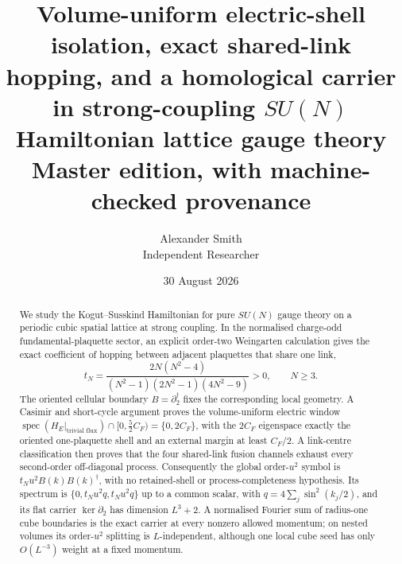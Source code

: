 \documentclass[11pt]{article}
\theoremstyle{plain}
\theoremstyle{definition}
\theoremstyle{remark}
\newcommand{\CF}{C_F}
\newcommand{\dg}{^{\dagger}}
\begin{document}
\title{\bfseries Volume-uniform electric-shell isolation, exact shared-link
hopping, and a homological carrier\\
in strong-coupling $SU(N)$ Hamiltonian lattice gauge theory\\[2mm]
\large Master edition, with machine-checked provenance}
\author{Alexander Smith\\ \small Independent Researcher}
\date{30 August 2026}
\maketitle

\begin{abstract}
\noindent
We study the Kogut--Susskind Hamiltonian for pure $SU(N)$ gauge theory on a
periodic cubic spatial lattice at strong coupling. In the normalised
charge-odd fundamental-plaquette sector, an explicit order-two Weingarten
calculation gives the exact coefficient of hopping between adjacent
plaquettes that share one link,
\[
  t_N=\frac{2N(N^2-4)}{(N^2-1)(2N^2-1)(4N^2-9)}>0,\qquad N\ge 3 .
\]
The oriented cellular boundary $B=\partial_2\dg$ fixes the corresponding local
geometry. A Casimir and short-cycle argument proves the volume-uniform
electric window
$\operatorname{spec}(H_E|_{\text{trivial flux}})\cap[0,\tfrac52\CF)=\{0,2\CF\}$,
with the $2\CF$ eigenspace exactly the oriented one-plaquette shell and an
external margin at least $\CF/2$. A link-centre classification then proves
that the four shared-link fusion channels exhaust every second-order
off-diagonal process. Consequently the global order-$u^2$ symbol is
$t_Nu^2B(k)B(k)\dg$, with no retained-shell or process-completeness
hypothesis. Its spectrum is
$\{0,t_Nu^2q,t_Nu^2q\}$ up to a common scalar, with
$q=4\sum_j\sin^2(k_j/2)$, and its flat carrier
$\ker\partial_2$ has dimension $L^3+2$. A normalised Fourier sum of
radius-one cube boundaries is the exact carrier at every nonzero allowed
momentum; on nested volumes its order-$u^2$ splitting is $L$-independent,
although one local cube seed has only $O(L^{-3})$ weight at a fixed momentum.


\end{abstract}
\end{document}
